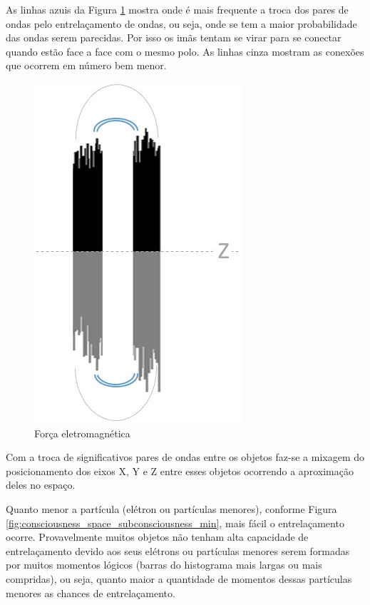 As linhas azuis da Figura \ref{fig:consciousness_electromaagnetic_force} mostra onde é mais frequente a troca dos pares de ondas pelo entrelaçamento de ondas, ou seja, onde se tem a maior probabilidade das ondas serem parecidas. Por isso os imãs tentam se virar para se conectar quando estão face a face com o mesmo polo. As linhas cinza mostram as conexões que ocorrem em número bem menor. 
	\begin{figure}[H]
	\caption{Força eletromagnética}
	\label{fig:consciousness_electromaagnetic_force}
	\centering
	\includegraphics[scale=.6]{sections/images/consciousness_electromaagnetic_force.jpg}
	\end{figure}

Com a troca de significativos pares de ondas entre os objetos faz-se a mixagem do posicionamento dos eixos X, Y e Z entre esses objetos ocorrendo a aproximação deles no espaço. 

Quanto menor a partícula (elétron ou partículas menores), conforme Figura \ref{fig:consciousness_space_subconsciousness_min}, mais fácil o entrelaçamento ocorre. Provavelmente muitos objetos não tenham alta capacidade de entrelaçamento devido aos seus elétrons ou partículas menores serem formadas por muitos momentos lógicos (barras do histograma mais largas ou mais compridas), ou seja, quanto maior a quantidade de momentos dessas partículas menores as chances de entrelaçamento.

